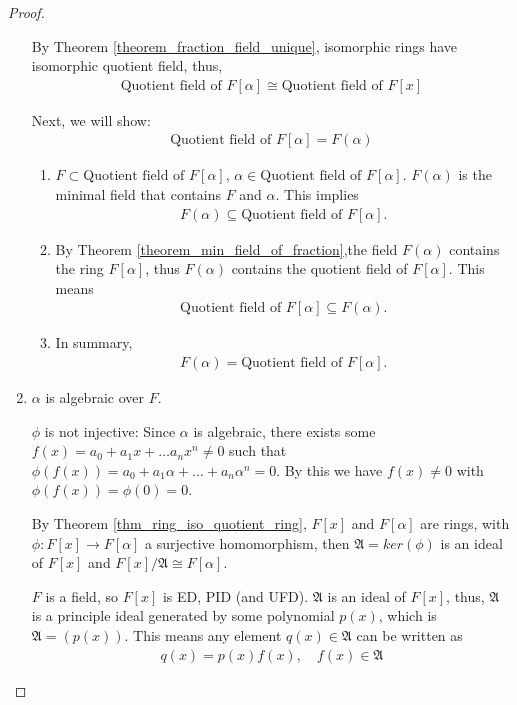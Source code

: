\documentclass[utf8]{ctexbook}
\theoremstyle{definition}
\begin{document}
\begin{proof}
\begin{enumerate}
{By Theorem \ref{theorem_fraction_field_unique}, isomorphic rings have isomorphic quotient field, thus,
\begin{align*}
\mbox{Quotient field of } F[\alpha] \cong \mbox{Quotient field of } F[x]
\end{align*}

Next, we will show:
\begin{align*}
\mbox{Quotient field of } F[\alpha] = F(\alpha)
\end{align*}

\begin{enumerate}
\item{$F \subset \mbox{Quotient field of } F[\alpha] $, $\alpha \in \mbox{Quotient field of } F[\alpha] $. $F(\alpha)$ is the minimal field that contains $F$ and $\alpha$. This implies
\begin{align*}
F(\alpha) \subseteq \mbox{Quotient field of } F[\alpha] .
\end{align*}
}
\item{By Theorem \ref{theorem_min_field_of_fraction},the field $F(\alpha)$ contains the ring $F[\alpha]$, thus $F(\alpha)$ contains the quotient field of $F[\alpha]$. This means
\begin{align*}
\mbox{Quotient field of } F[\alpha] \subseteq F(\alpha) .
\end{align*}
}
\item{In summary,
\begin{align*}
F(\alpha) = \mbox{Quotient field of } F[\alpha] .
\end{align*}
}
\end{enumerate}

}
\item{$\alpha$ is algebraic over $F$.

$\phi$ is not injective: Since $\alpha $ is algebraic, there exists some $f(x) = a_0 + a_1 x + \ldots a_n x^n \neq 0$ such that $\phi(f(x)) = a_0 + a_1 \alpha + \ldots + a_n \alpha^n = 0$. By this we have $f(x ) \neq 0$ with $\phi(f(x)) = \phi(0) = 0$. 

By Theorem \ref{thm_ring_iso_quotient_ring}, $F[x]$ and $F[\alpha]$ are rings, with $\phi: F[x] \longrightarrow F[\alpha]$ a surjective homomorphism, then $\mathfrak{A} = ker(\phi)$ is an ideal of $F[x]$ and $F[x] /\mathfrak{A} \cong F[\alpha]$.

$F$ is a field, so $F[x]$ is ED, PID (and UFD). $\mathfrak{A}$ is an ideal of $F[x]$, thus, $\mathfrak{A}$ is a principle ideal generated by some polynomial $p(x)$, which is $\mathfrak{A}= (p(x))$. This means any element $q(x) \in \mathfrak{A}$ can be written as
\begin{align*}
q(x) = p(x) f(x), \quad f(x) \in \mathfrak{A}
\end{align*}

}
\end{enumerate}
\end{proof}
\end{document}

